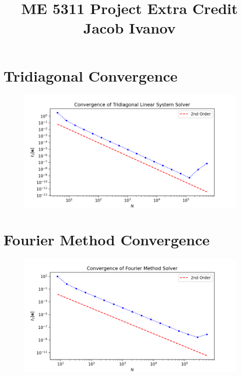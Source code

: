 \documentclass[12pt, reqno]{amsart}
\begin{document}
\title{ME 5311 \quad Project Extra Credit \quad Jacob Ivanov}

\maketitle
\section{Tridiagonal Convergence}
\begin{figure}[H]
    \centering
    \includegraphics[width=1\linewidth]{tridiagonal_convergence.png}
\end{figure}

\section{Fourier Method Convergence}
\begin{figure}[H]
    \centering
    \includegraphics[width=1\linewidth]{fourier_convergence.png}
\end{figure}
\end{document}
